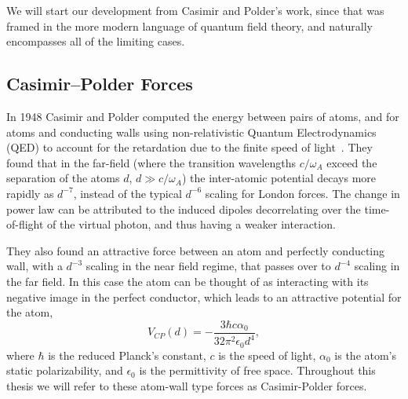 We will start our development from Casimir and Polder's work, since that was framed in the more modern language of quantum field theory, 
and naturally encompasses all of the limiting cases.  

\subsection{Casimir--Polder Forces}

In 1948 Casimir and Polder computed the energy between pairs of atoms, and for atoms and conducting walls 
using non-relativistic Quantum Electrodynamics (QED) to account for the retardation due to the finite speed of light~\cite{CasimirPolder1948}. 
They found that in the far-field 
(where the transition wavelengths $c/\omega_A$ exceed the separation of the atoms $d$, $d\gg c/\omega_A$)
the inter-atomic potential decays more rapidly as $d^{-7}$, instead of the typical $d^{-6}$ scaling for London forces.
 The change in power law can be 
attributed to the induced dipoles decorrelating over the time-of-flight of the virtual photon, 
and thus having a weaker interaction.
  
They also found an attractive force between an atom and perfectly conducting wall, with a $d^{-3}$ scaling
in the near field regime, that passes over to $d^{-4}$ scaling in the far field.
In this case the atom can be thought of as interacting with its negative image in the perfect conductor,   
which leads to an attractive potential for the atom,
\begin{equation}
  V_{CP}(d) =-\frac{3\hbar c\alpha_0}{32\pi^2\epsilon_0 d^4},
\end{equation}
where $\hbar$ is the reduced Planck's constant, $c$ is the speed of light, $\alpha_0$ is the atom's static polarizability,
and $\epsilon_0$ is the permittivity of free space.  Throughout this thesis we will refer to these
atom-wall type forces as Casimir-Polder forces.  

